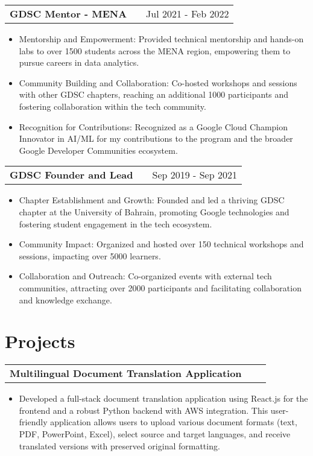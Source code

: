 \documentclass[a4paper,11pt]{article}
\makeatletter
\newenvironment{joblong}[2]
    {
    \begin{tabularx}{\linewidth}{@{}l X r@{}}
    \textbf{#1} & \hfill &  #2 \\[3.75pt]
    \end{tabularx}
    \begin{minipage}[t]{\linewidth}
    \begin{itemize}[nosep,after=\strut, leftmargin=1em, itemsep=3pt,label=--]
    }
    {
    \end{itemize}
    \end{minipage}    
    }
\newenvironment{projectlong}[2]
    {
    \begin{tabularx}{\linewidth}{@{}l X r@{}}
    \textbf{#1} & \hfill &  #2 \\[3.75pt]
    \end{tabularx}
    \begin{minipage}[t]{\linewidth}
    \begin{itemize}[nosep,after=\strut, leftmargin=1em, itemsep=3pt,label=--]
    }
    {
    \end{itemize}
    \end{minipage}    
    }
\makeatother
\begin{document}
\begin{joblong}{GDSC Mentor - MENA}{Jul 2021 - Feb 2022}
\item Mentorship and Empowerment: Provided technical mentorship and hands-on labs to over 1500 students across the MENA region, empowering them to pursue careers in data analytics.
\item Community Building and Collaboration: Co-hosted workshops and sessions with other GDSC chapters, reaching an additional 1000 participants and fostering collaboration within the tech community.
\item Recognition for Contributions: Recognized as a Google Cloud Champion Innovator in AI/ML for my contributions to the program and the broader Google Developer Communities ecosystem.

\end{joblong}

\begin{joblong}{GDSC Founder and Lead}{Sep 2019 - Sep 2021}
\item Chapter Establishment and Growth: Founded and led a thriving GDSC chapter at the University of Bahrain, promoting Google technologies and fostering student engagement in the tech ecosystem.
\item Community Impact: Organized and hosted over 150 technical workshops and sessions, impacting over 5000 learners.
\item Collaboration and Outreach: Co-organized events with external tech communities, attracting over 2000 participants and facilitating collaboration and knowledge exchange.

\end{joblong}
  
\section{Projects}

\begin{projectlong}{Multilingual Document Translation Application}{}
    \item Developed a full-stack document translation application using React.js for the frontend and a robust Python backend with AWS integration. This user-friendly application allows users to upload various document formats (text, PDF, PowerPoint, Excel), select source and target languages, and receive translated versions with preserved original formatting.
\end{projectlong}
\end{document}
